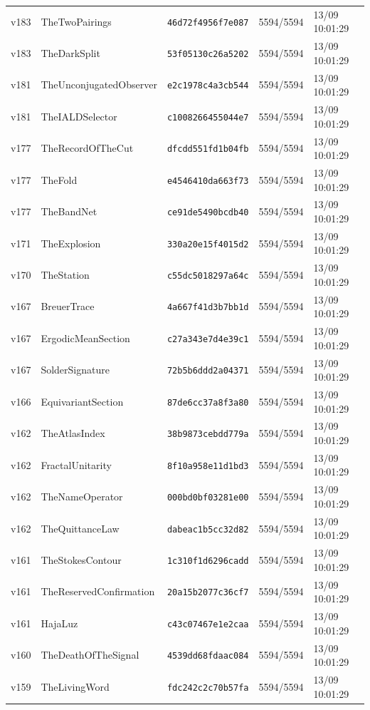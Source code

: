 \documentclass[11pt]{article}
\theoremstyle{definition}\newtheorem{deriv}{Derivation}
\begin{document}
{\begin{longtable}{@{}lllll@{}}
v183 & TheTwoPairings & \texttt{46d72f4956f7e087} & 5594/5594 & 13/09 10:01:29 \\
v183 & TheDarkSplit & \texttt{53f05130c26a5202} & 5594/5594 & 13/09 10:01:29 \\
v181 & TheUnconjugatedObserver & \texttt{e2c1978c4a3cb544} & 5594/5594 & 13/09 10:01:29 \\
v181 & TheIALDSelector & \texttt{c1008266455044e7} & 5594/5594 & 13/09 10:01:29 \\
v177 & TheRecordOfTheCut & \texttt{dfcdd551fd1b04fb} & 5594/5594 & 13/09 10:01:29 \\
v177 & TheFold & \texttt{e4546410da663f73} & 5594/5594 & 13/09 10:01:29 \\
v177 & TheBandNet & \texttt{ce91de5490bcdb40} & 5594/5594 & 13/09 10:01:29 \\
v171 & TheExplosion & \texttt{330a20e15f4015d2} & 5594/5594 & 13/09 10:01:29 \\
v170 & TheStation & \texttt{c55dc5018297a64c} & 5594/5594 & 13/09 10:01:29 \\
v167 & BreuerTrace & \texttt{4a667f41d3b7bb1d} & 5594/5594 & 13/09 10:01:29 \\
v167 & ErgodicMeanSection & \texttt{c27a343e7d4e39c1} & 5594/5594 & 13/09 10:01:29 \\
v167 & SolderSignature & \texttt{72b5b6ddd2a04371} & 5594/5594 & 13/09 10:01:29 \\
v166 & EquivariantSection & \texttt{87de6cc37a8f3a80} & 5594/5594 & 13/09 10:01:29 \\
v162 & TheAtlasIndex & \texttt{38b9873cebdd779a} & 5594/5594 & 13/09 10:01:29 \\
v162 & FractalUnitarity & \texttt{8f10a958e11d1bd3} & 5594/5594 & 13/09 10:01:29 \\
v162 & TheNameOperator & \texttt{000bd0bf03281e00} & 5594/5594 & 13/09 10:01:29 \\
v162 & TheQuittanceLaw & \texttt{dabeac1b5cc32d82} & 5594/5594 & 13/09 10:01:29 \\
v161 & TheStokesContour & \texttt{1c310f1d6296cadd} & 5594/5594 & 13/09 10:01:29 \\
v161 & TheReservedConfirmation & \texttt{20a15b2077c36cf7} & 5594/5594 & 13/09 10:01:29 \\
v161 & HajaLuz & \texttt{c43c07467e1e2caa} & 5594/5594 & 13/09 10:01:29 \\
v160 & TheDeathOfTheSignal & \texttt{4539dd68fdaac084} & 5594/5594 & 13/09 10:01:29 \\
v159 & TheLivingWord & \texttt{fdc242c2c70b57fa} & 5594/5594 & 13/09 10:01:29 \\

\end{longtable}}
\end{document}
